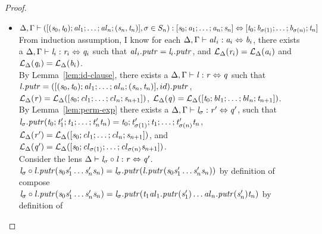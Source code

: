 \begin{lemma}
\begin{proof}
\begin{itemize}
\item$\Delta, \Gamma \vdash ([(\mathit{s}_0,\mathit{t}_0);\mathit{al}_1;\ldots;\mathit{al}_n;(\mathit{s}_n,\mathit{t}_n)],\sigma \in S_n) : [\mathit{s}_0 ; \mathit{a}_1 ; \ldots ; \mathit{a}_n ; \mathit{s}_n] \Leftrightarrow [\mathit{t}_0; \mathit{b}_{\sigma(1)} ; \ldots ; \mathit{b}_{\sigma(n)} ; \mathit{t}_n]$\\
From induction assumption, I know for each $\Delta, \Gamma \vdash \mathit{al}_i : \mathit{a}_i \Leftrightarrow \mathit{b}_i$, there exists a $\Delta, \Gamma \vdash \mathit{l}_i : \mathit{r}_i \Leftrightarrow \mathit{q}_i$ such that $\mathit{al}_i.\mathit{putr}=\mathit{l}_i.\mathit{putr}$,
and $\mathcal{L}_{\Delta}(\mathit{r}_i)=\mathcal{L}_{\Delta}(\mathit{a}_i)$ and $\mathcal{L}_{\Delta}(\mathit{q}_i)=\mathcal{L}_{\Delta}(\mathit{b}_i)$.\\
By Lemma~\ref{lem:id-clause}, there exists a $\Delta, \Gamma \vdash \mathit{l} : \mathit{r} \Leftrightarrow \mathit{q}$ such that $\mathit{l}.\mathit{putr}=([(\mathit{s}_0,\mathit{t}_0);\mathit{al}_1;\ldots;\mathit{al}_n;(\mathit{s}_n,\mathit{t}_n)],id).\mathit{putr}$,
$\mathcal{L}_{\Delta}(\mathit{r})=\mathcal{L}_{\Delta}([\mathit{s}_0;\mathit{cl}_1;\ldots;\mathit{cl}_n;\mathit{s}_{n+1}])$,
$\mathcal{L}_{\Delta}(\mathit{q})=\mathcal{L}_{\Delta}([\mathit{t}_0;\mathit{bl}_1;\ldots;\mathit{bl}_n;\mathit{t}_{n+1}])$.\\
By Lemma~\ref{lem:perm-exp} there exists a $\Delta, \Gamma \vdash \mathit{l}_{\sigma} : \mathit{r}' \Leftrightarrow \mathit{q}'$,
such that $\mathit{l}_{\sigma}.\mathit{putr}(\mathit{t}_0;\mathit{t}_1';\mathit{t}_1;\ldots;\mathit{t}_n'\mathit{t}_n)=\mathit{t}_0;\mathit{t}_{\sigma(1)}';\mathit{t}_1;\ldots;\mathit{t}_{\sigma(n)}'\mathit{t}_n$,
$\mathcal{L}_{\Delta}(\mathit{r}')=\mathcal{L}_{\Delta}([\mathit{s}_0;\mathit{cl}_1;\ldots;\mathit{cl}_n;\mathit{s}_{n+1}])$, and
$\mathcal{L}_{\Delta}(\mathit{q}')=\mathcal{L}_{\Delta}([\mathit{s}_0;\mathit{cl}_{\sigma(1)};\ldots;\mathit{cl}_{\sigma(n)}\mathit{s}_{n+1}])$.\\
Consider the lens $\Delta \vdash \mathit{l}_{\sigma} \circ \mathit{l} : \mathit{r} \Leftrightarrow \mathit{q}'$.\\
$\mathit{l}_{\sigma} \circ \mathit{l}.\mathit{putr}(\mathit{s}_0\mathit{s}_1'\ldots\mathit{s}_n'\mathit{s}_n)=\mathit{l}_{\sigma}.\mathit{putr}(\mathit{l}.\mathit{putr}(\mathit{s}_0\mathit{s}_1'\ldots\mathit{s}_n'\mathit{s}_n))$ by definition of compose\\
$\mathit{l}_{\sigma} \circ \mathit{l}.\mathit{putr}(\mathit{s}_0\mathit{s}_1'\ldots\mathit{s}_n'\mathit{s}_n)=\mathit{l}_{\sigma}.\mathit{putr}(\mathit{t}_1\mathit{al}_1.\mathit{putr}(\mathit{s}_1')\ldots\mathit{al}_n.\mathit{putr}(\mathit{s}_n')\mathit{t}_n)$ by definition of \Lens{}\\

\end{itemize}
\end{proof}
\end{lemma}
